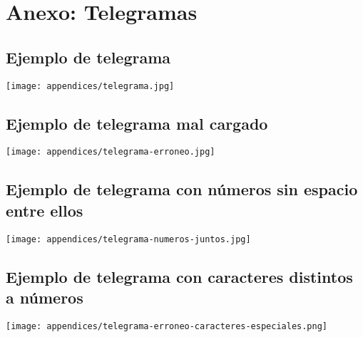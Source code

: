 \chapter{Anexo: Telegramas}

\section{Ejemplo de telegrama}
\label{anexo:telegrama}

\texttt{[image: appendices/telegrama.jpg]}

\section{Ejemplo de telegrama mal cargado}
\label{anexo:telegrama-erroneo}

\texttt{[image: appendices/telegrama-erroneo.jpg]}

\section{Ejemplo de telegrama con n\'umeros sin espacio entre ellos}
\label{anexo:telegrama-numeros-juntos}

\texttt{[image: appendices/telegrama-numeros-juntos.jpg]}

\section{Ejemplo de telegrama con caracteres distintos a n\'umeros}
\label{anexo:telegrama-erroneo-caracteres-especiales}

\texttt{[image: appendices/telegrama-erroneo-caracteres-especiales.png]}
